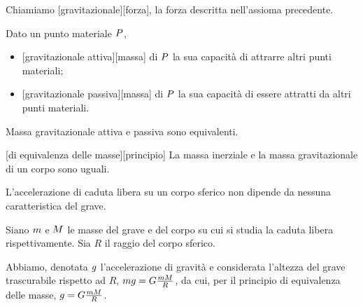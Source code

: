 \begin{Definition}
	Chiamiamo [gravitazionale][forza], la forza descritta nell'assioma precedente.
\end{Definition}
\begin{Definition}
	Dato un punto materiale $P$,
	\begin{itemize}
		\item {}[gravitazionale attiva][massa] di $P$ la sua capacit\`a di attrarre altri punti materiali;
		\item {}[gravitazionale passiva][massa] di $P$ la sua capacit\`a di essere attratti da altri punti materiali.
	\end{itemize}
\end{Definition}
\begin{Theorem}
	Massa gravitazionale attiva e passiva sono equivalenti.
\end{Theorem}
\begin{Axiom}
	[di equivalenza delle masse][principio] La massa inerziale e la massa gravitazionale di un corpo sono uguali.
\end{Axiom}
\begin{Theorem}
	L'accelerazione di caduta libera su un corpo sferico non dipende da nessuna caratteristica del grave.
\end{Theorem}
\Proof Siano $m$ e $M$ le masse del grave e del corpo su cui si studia la caduta libera rispettivamente. Sia $R$ il raggio del corpo sferico.
\par Abbiamo, denotata $g$ l'accelerazione di gravit\`a e considerata l'altezza del grave trascurabile rispetto ad $R$, $m g = G \frac{mM}{R}$, da cui, per il principio di equivalenza delle masse, $g = G \frac{mM}{R}$. \EndProof
